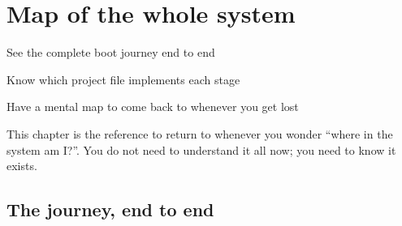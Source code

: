 \chapter{Map of the whole system}

\begin{goals}
  \item See the complete boot journey end to end
  \item Know which project file implements each stage
  \item Have a mental map to come back to whenever you get lost
\end{goals}

This chapter is the reference to return to whenever you wonder ``where in the system am I?''. You
do not need to understand it all now; you need to know it exists.

\section{The journey, end to end}

